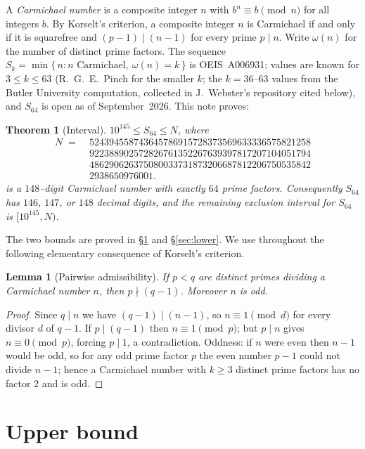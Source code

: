 \documentclass[11pt]{article}
\newtheorem{theorem}{Theorem}
\newtheorem{lemma}{Lemma}
\theoremstyle{definition}
\newcommand{\Smin}{S_{64}}
\begin{document}
A \emph{Carmichael number} is a composite integer $n$ with $b^{n}\equiv b \pmod n$ for all integers
$b$. By Korselt's criterion, a composite integer $n$ is Carmichael if and only if it is squarefree
and $(p-1)\mid(n-1)$ for every prime $p\mid n$. Write $\omega(n)$ for the number of distinct prime
factors. The sequence $S_k=\min\{\,n : n \text{ Carmichael},\ \omega(n)=k\,\}$ is
OEIS~A006931; values are known for $3\le k\le 63$ (R.~G.~E.~Pinch for the smaller $k$; the
$k=36$--$63$ values from the Butler University computation, collected in J.~Webster's repository
cited below), and $S_{64}$ is open as of September~2026. This note proves:

\begin{theorem}[Interval]\label{thm:interval}
$10^{145}\le \Smin \le N$, where
\[
  \begin{aligned}
  N \;=\;{}& 524394558743645786915728373569633336575821258\\
  &922388902572826761352267639397817207104051794\\
  &486290626375080033731873206687812206750535842\\
  &2938650976001 .
\end{aligned}
\]
is a $148$--digit Carmichael number with exactly $64$ prime factors. Consequently $\Smin$ has
$146$, $147$, or $148$ decimal digits, and the remaining exclusion interval for $\Smin$ is
$[10^{145},N)$.
\end{theorem}

The two bounds are proved in \S\ref{sec:upper} and \S\ref{sec:lower}. We use throughout the
following elementary consequence of Korselt's criterion.

\begin{lemma}[Pairwise admissibility]\label{lem:adm}
If $p<q$ are distinct primes dividing a Carmichael number $n$, then $p\nmid(q-1)$. Moreover $n$ is
odd.
\end{lemma}

\begin{proof}
Since $q\mid n$ we have $(q-1)\mid(n-1)$, so $n\equiv 1\pmod{d}$ for every divisor $d$ of $q-1$. If
$p\mid(q-1)$ then $n\equiv 1\pmod p$; but $p\mid n$ gives $n\equiv 0\pmod p$, forcing $p\mid 1$, a
contradiction. Oddness: if $n$ were even then $n-1$ would be odd, so for any odd prime factor $p$
the even number $p-1$ could not divide $n-1$; hence a Carmichael number with $k\ge3$ distinct prime
factors has no factor $2$ and is odd.
\end{proof}

\section{Upper bound}\label{sec:upper}
\end{document}
